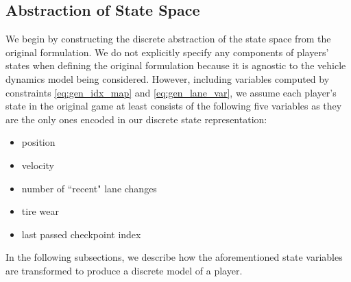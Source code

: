 \subsection{Abstraction of State Space} \label{section:discstate}
We begin by constructing the discrete abstraction of the state space from the original formulation. We do not explicitly specify any components of players' states when defining the original formulation because it is agnostic to the vehicle dynamics model being considered. However, including variables computed by constraints \eqref{eq:gen_idx_map} and \eqref{eq:gen_lane_var}, we assume each player's state in the original game at least consists of the following five variables as they are the only ones encoded in our discrete state representation:
\begin{itemize}
    \item position
    \item velocity
    \item number of ``recent" lane changes
    \item tire wear
    \item last passed checkpoint index
\end{itemize}
In the following subsections, we describe how the aforementioned state variables are transformed to produce a discrete model of a player.

